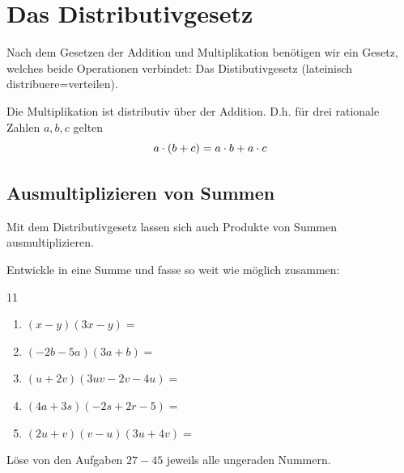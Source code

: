 \documentclass[11pt,oneside]{article}
\begin{document}
\newpage
\section{Das Distributivgesetz}
    Nach dem Gesetzen der Addition und Multiplikation benötigen wir ein Gesetz, welches beide Operationen verbindet: Das Distibutivgesetz (lateinisch distribuere=verteilen).
    \begin{satz}
        Die Multiplikation ist distributiv über der Addition. D.h. für drei rationale Zahlen $a,b,c$ gelten
        \[a\cdot(b+c)=a\cdot b+a\cdot c\]
        \begin{figure}[H]
            \centering\vspace*{-20pt}
        \end{figure}
    \end{satz}

\subsection{Ausmultiplizieren von Summen}
    Mit dem Distributivgesetz lassen sich auch Produkte von Summen ausmultiplizieren.
    \begin{beispiel}\label{bsp:Distributiv}
    	Entwickle in eine Summe und fasse so weit wie möglich zusammen:
    	\begin{gridspace}{11}
    		\begin{enumerate}[label=\alph*)]
    			\item $(x-y)(3x-y)=$\\
    			\item $(-2b-5a)(3a+b)=$\\
    			\item $(u+2v)(3uv-2v-4u)=$\\
    			\item $(4a+3s)(-2s+2r-5)=$\\
    			\item $(2u+v)(v-u)(3u+4v)=$\\
    		\end{enumerate}
    	\end{gridspace}
    \end{beispiel}
    \begin{aufgabe}
        Löse von den Aufgaben $27-45$ jeweils alle ungeraden Nummern.
    \end{aufgabe}
\end{document}
